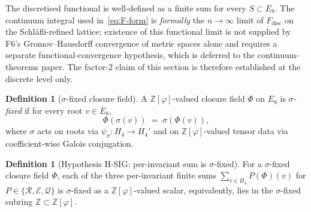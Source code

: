 \documentclass[12pt]{article}
\theoremstyle{definition}
\newtheorem{definition}[theorem]{Definition}
\theoremstyle{remark}
\newcommand{\Zphi}{\mathbb{Z}[\varphi]}
\begin{document}
The discretised functional is well-defined as a finite sum for every $S \subset E_8$. The continuum integral used in~\eqref{eq:F-form} is \emph{formally} the $n \to \infty$ limit of $F_{\mathrm{disc}}$ on the Schl\"afli-refined lattice; existence of this functional limit is not supplied by F6's Gromov--Hausdorff convergence of metric spaces alone and requires a separate functional-convergence hypothesis, which is deferred to the continuum-theorems paper. The factor-$2$ claim of this section is therefore established at the discrete level only.

\begin{definition}[$\sigma$-fixed closure field]\label{def:sigma-fixed}
A $\Zphi$-valued closure field $\Phi$ on $E_8$ is \emph{$\sigma$-fixed} if for every root $v \in E_8$,
\begin{equation}\label{eq:sigma-fixed}
\Phi(\sigma(v)) \;=\; \sigma(\Phi(v)),
\end{equation}
where $\sigma$ acts on roots via $\psi_\sigma : H_4 \to H_4'$ and on $\Zphi$-valued tensor data via coefficient-wise Galois conjugation.
\end{definition}

\begin{definition}[Hypothesis H-SIG: per-invariant sum is $\sigma$-fixed]\label{hyp:SIG}
For a $\sigma$-fixed closure field $\Phi$, each of the three per-invariant finite sums $\sum_{v \in H_4} P(\Phi)(v)$ for $P \in \{\mathcal R, \mathcal E, \mathcal Q\}$ is $\sigma$-fixed as a $\Zphi$-valued scalar, equivalently, lies in the $\sigma$-fixed subring $\mathbb{Z} \subset \Zphi$.
\end{definition}
\end{document}
